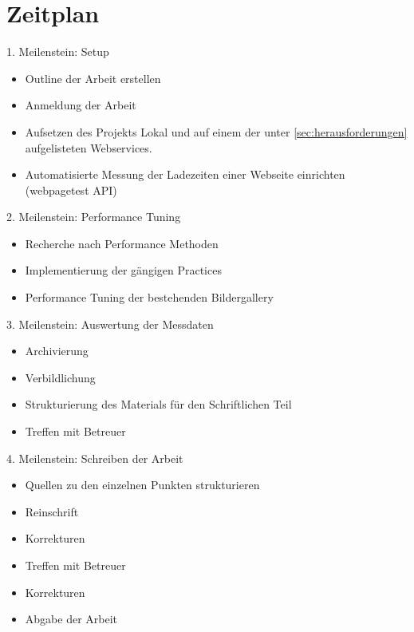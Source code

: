 \documentclass[a4paper,11pt,singlespacing]{article}
\begin{document}
\section{Zeitplan} %
\label{sec:zeitplan}
	1. Meilenstein: Setup
	\begin{itemize}
		\item Outline der Arbeit erstellen
		\item Anmeldung der Arbeit
		\item Aufsetzen des Projekts Lokal und auf einem der unter \ref{sec:herausforderungen} aufgelisteten Webservices.
		\item Automatisierte Messung der Ladezeiten einer Webseite einrichten (webpagetest API)
	\end{itemize}

	2. Meilenstein: Performance Tuning
	\begin{itemize}
		\item Recherche nach Performance Methoden
		\item Implementierung der gängigen Practices
		\item Performance Tuning der bestehenden Bildergallery
	\end{itemize}

	3. Meilenstein: Auswertung der Messdaten
	\begin{itemize}
		\item Archivierung
		\item Verbildlichung
		\item Strukturierung des Materials für den Schriftlichen Teil
		\item Treffen mit Betreuer
	\end{itemize}

	4. Meilenstein: Schreiben der Arbeit
	\begin{itemize}
		\item Quellen zu den einzelnen Punkten strukturieren
		\item Reinschrift
		\item Korrekturen
		\item Treffen mit Betreuer
		\item Korrekturen
		\item Abgabe der Arbeit
	\end{itemize}


\pagebreak
\printbibliography
\end{document}
